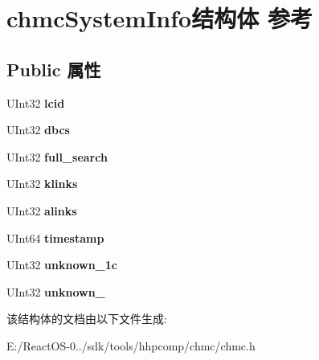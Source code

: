 \hypertarget{structchmc_system_info}{}\section{chmc\+System\+Info结构体 参考}
\label{structchmc_system_info}
\subsection*{Public 属性}
\begin{DoxyCompactItemize}
\item 
\mbox{\label{structchmc_system_info_a11eba0c0da05bbb5e815dbf8ae8a0789}} 
U\+Int32 {\bfseries lcid}
\item 
\mbox{\label{structchmc_system_info_a447eb95da2d9f47d4dc1ae905a3d00e5}} 
U\+Int32 {\bfseries dbcs}
\item 
\mbox{\label{structchmc_system_info_ab9dd6d8cf8e9ed642746aad882e4e30e}} 
U\+Int32 {\bfseries full\+\_\+search}
\item 
\mbox{\label{structchmc_system_info_a20b4f7e82686925f6c308086f99e6488}} 
U\+Int32 {\bfseries klinks}
\item 
\mbox{\label{structchmc_system_info_a3f8dfcd78c186be935eb8e0f6874f8db}} 
U\+Int32 {\bfseries alinks}
\item 
\mbox{\label{structchmc_system_info_acb7d179496dac68acae2aa8fb68649cf}} 
U\+Int64 {\bfseries timestamp}
\item 
\mbox{\label{structchmc_system_info_aca52d46c35a8117600a09ab2d4e661ce}} 
U\+Int32 {\bfseries unknown\+\_\+1c}
\item 
\mbox{\label{structchmc_system_info_a8cc2c1e84c549445e1a3c6b4cb3469b7}} 
U\+Int32 {\bfseries unknown\+\_}
\end{DoxyCompactItemize}


该结构体的文档由以下文件生成\+:\begin{DoxyCompactItemize}
\item 
E\+:/\+React\+O\+S-\/0../sdk/tools/hhpcomp/chmc/chmc.\+h\end{DoxyCompactItemize}
